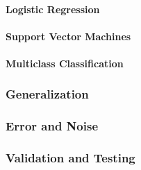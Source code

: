 \paragraph{Logistic Regression}
\label{par:LogisticRegression}
\paragraph{Support Vector Machines}
\label{par:SupportVectorMachines}
\paragraph{Multiclass Classification}
\label{par:MulticlassClassification}
\subsubsection{Generalization}
\label{ssub:Generalization}
\subsubsection{Error and Noise}
\label{ssub:ErrorandNoise}
\subsubsection{Validation and Testing}
\label{ssub:ValidationandTesting}
